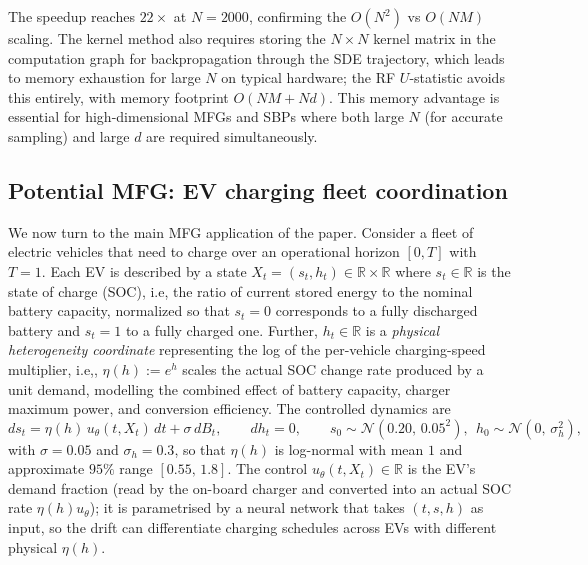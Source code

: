 \documentclass[11pt,leqno]{article}
\theoremstyle{plain}
\theoremstyle{remark}
\theoremstyle{definition}
\numberwithin{equation}{section}
\numberwithin{figure}{section}
\numberwithin{table}{section}
\numberwithin{algorithm}{section}
\newcommand{\RR}{\mathbb{R}}
\begin{document}
The speedup reaches $22\times$ at $N=2000$, confirming the $O(N^2)$ vs $O(NM)$ scaling.
The kernel method also requires storing the $N\times N$ kernel matrix in the computation graph
for backpropagation through the SDE trajectory,
which leads to memory exhaustion for large $N$ on typical hardware;
the RF $U$-statistic avoids this entirely, with memory footprint $O(NM + Nd)$.
This memory advantage is essential for high-dimensional MFGs and SBPs
where both large $N$ (for accurate sampling) and large $d$ are required simultaneously.


\subsection{Potential MFG: EV charging fleet coordination}\label{sec:5ev}

We now turn to the main MFG application of the paper.
Consider a fleet of electric vehicles that need to charge over an operational horizon $[0,T]$ with $T=1$.
Each EV is described by a state $X_t=(s_t,h_t)\in\RR\times\RR$ where $s_t\in\RR$ is the state of charge (SOC), i.e, 
the ratio of current stored energy to the nominal battery capacity, normalized so that
$s_t=0$ corresponds to a fully discharged battery and $s_t=1$ to a fully charged one. Further, 
$h_t\in\RR$ is a \emph{physical heterogeneity coordinate}
representing the log of the per-vehicle charging-speed multiplier,
i.e,, $\eta(h):=e^h$ scales the actual SOC change rate produced by a unit demand,
modelling the combined effect of battery capacity, charger maximum power, and conversion efficiency.
The controlled dynamics are
\begin{equation}\label{eq:5ev.dyn}
 ds_t = \eta(h)\,u_\theta(t,X_t)\,dt + \sigma\,dB_t,\qquad dh_t = 0,\qquad
 s_0\sim \mathcal{N}(0.20,\,0.05^2),\ \ h_0\sim\mathcal{N}(0,\,\sigma_h^2),
\end{equation}
with $\sigma=0.05$ and $\sigma_h=0.3$,
so that $\eta(h)$ is log-normal with mean $1$ and approximate $95\%$ range $[0.55,\,1.8]$.
The control $u_\theta(t,X_t)\in\RR$ is the EV's demand fraction
(read by the on-board charger and converted into an actual SOC rate $\eta(h)u_\theta$);
it is parametrised by a neural network that takes $(t,s,h)$ as input,
so the drift can differentiate charging schedules across EVs with different physical $\eta(h)$.
\end{document}
